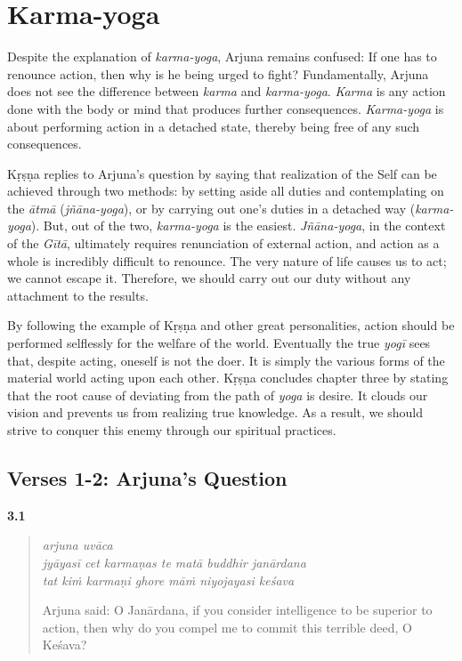 \chapter{Karma-yoga}\label{chap-karma-yoga}

\noindent Despite the explanation of \textit{karma-yoga}, Arjuna remains confused: If one has to renounce action, then why is he being urged to fight? Fundamentally, Arjuna does not see the difference between \textit{karma} and \textit{karma-yoga}. \textit{Karma} is any action done with the body or mind that produces further consequences. \textit{Karma-yoga} is about performing action in a detached state, thereby being free of any such consequences.

Kṛṣṇa replies to Arjuna’s question by saying that realization of the Self can be achieved through two methods: by setting aside all duties and contemplating on the \textit{ātmā} (\textit{jñāna-yoga}), or by carrying out one’s duties in a detached way (\textit{karma-yoga}). But, out of the two, \textit{karma-yoga} is the easiest. \textit{Jñāna-yoga}, in the context of the \textit{Gītā}, ultimately requires renunciation of external action, and action as a whole is incredibly difficult to renounce. The very nature of life causes us to act; we cannot escape it. Therefore, we should carry out our duty without any attachment to the results.

By following the example of Kṛṣṇa and other great personalities, action should be performed selflessly for the welfare of the world. Eventually the true \textit{yogī} sees that, despite acting, oneself is not the doer. It is simply the various forms of the material world acting upon each other. Kṛṣṇa concludes chapter three by stating that the root cause of deviating from the path of \textit{yoga} is desire. It clouds our vision and prevents us from realizing true knowledge. As a result, we should strive to conquer this enemy through our spiritual practices.

\section{Verses 1-2: Arjuna's Question}\label{sec-verses-1-2-arjuna-s-question}

\par\noindent\textbf{3.1}\par
\begin{verse}
\textit{arjuna uvāca} \\
\textit{jyāyasī cet karmaṇas te matā buddhir janārdana} \\
\textit{tat kiṁ karmaṇi ghore māṁ niyojayasi keśava}

\noindent Arjuna said: O Janārdana, if you consider intelligence to be superior to action, then why do you compel me to commit this terrible deed, O Keśava?
\end{verse}
\par



